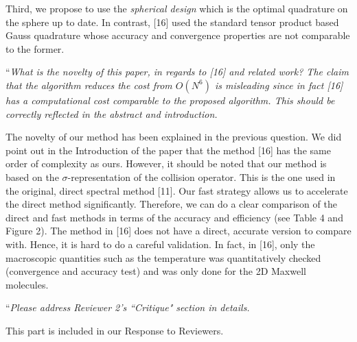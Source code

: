 \documentclass[11pt]{article}
\begin{document}
Third, we propose to use the {\it spherical design} which is the optimal quadrature on the sphere up to date. In contrast, [16] used the standard tensor product based Gauss quadrature whose accuracy and convergence properties are not comparable to the former.

 ``{\it What is the novelty of this paper, in regards to [16] and related work? The claim that the algorithm reduces the cost from $O(N^6)$ is misleading since in fact [16] has a computational cost comparable to the proposed algorithm. This should be correctly reflected in the abstract and introduction.}

The novelty of our method has been explained in the previous question. We did point out in the Introduction of the paper that the method [16] has the same order of complexity as ours. However, it should be noted that our method is based on the $\sigma$-representation of the collision operator. This is the one used in the original, direct spectral method [11]. Our fast strategy allows us to accelerate the direct method significantly. Therefore, we can do a clear comparison of the direct and fast methods in terms of the accuracy and efficiency (see Table 4 and Figure 2). The method in [16] does not have a direct, accurate version to compare with. Hence, it is hard to do a careful validation. In fact, in [16], only the macroscopic quantities such as the temperature was quantitatively checked (convergence and accuracy test) and was only done for the 2D Maxwell molecules. 



 ``{\it Please address Reviewer 2's ``Critique" section in details.}

This part is included in our Response to Reviewers.
\end{document}
